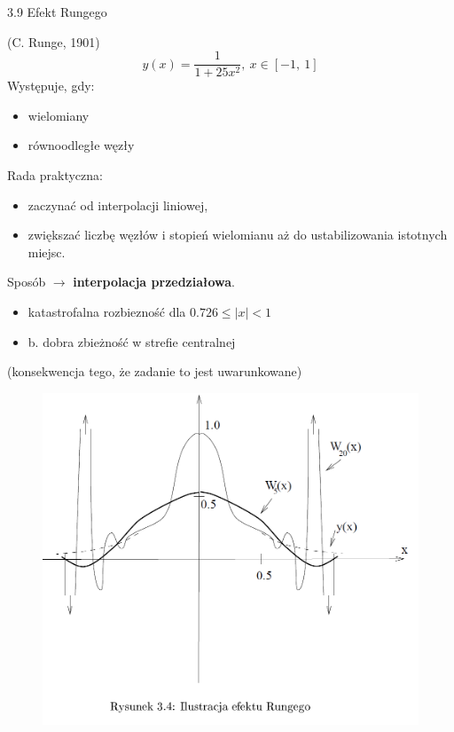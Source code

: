 \begin{frame}
{3.9 Efekt Rungego}

(C. Runge, 1901)
$$
y(x)=\frac{1}{1+25x^{2}},\ x\in[-1,\ 1]
$$
Występuje, gdy:
\begin{itemize}
\item wielomiany

\item równoodległe węzły
\end{itemize}

Rada praktyczna:

\begin{itemize}
\item zaczynać od interpolacji liniowej,

\item zwiększać liczbę węzłów i stopień wielomianu aż do ustabilizowania istotnych miejsc.
\end{itemize}


Sposób $\rightarrow$ \textbf{interpolacja przedziałowa}.
\begin{itemize}
\item katastrofalna rozbiezność dla $0.726\leq|x|<1$

\item b. dobra zbieżność w strefie centralnej
\end{itemize}

(konsekwencja tego, że zadanie to jest { uwarunkowane})
\end{frame}
\begin{frame}
\begin{figure}[h]
			\includegraphics[scale=0.35]{img/3/interpol_3_9}
	\end{figure}
\end{frame}